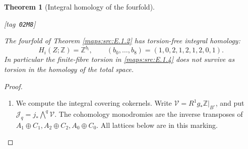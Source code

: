 \documentclass[11pt,a4paper]{article}
\makeatletter
\numberwithin{equation}{section}
\newtheorem{theorem}{Theorem}[section]
\theoremstyle{definition}
\newcommand{\StatementRecord}[4]{{\upshape\footnotesize[tag~\texttt{#3}]}\enspace\ignorespaces}
\newcommand{\SeriesRefText}[1]{\ifcsname SRef@#1\endcsname\csname SRef@#1\endcsname\else\textbf{UNRESOLVED}\fi}
\newcommand{\SeriesRef}[1]{\ifmmode\text{\SeriesRefText{#1}}\else\SeriesRefText{#1}\fi}
\makeatother
\begin{document}
\begin{theorem}[Integral homology of the fourfold]\hypertarget{tag-02M8}{}\label{maps:src:E.1.5}
\StatementRecord{maps:src:E.1.5}{proved}{02M8}{\cref{maps:src:E.1.2}, \cref{maps:src:E.1.4}, \eqref{maps:eq:E.I1}, \cref{maps:src:E.1.3}, \SeriesRef{maps:src:D.1.4}, \eqref{maps:eq:E.I2}, \eqref{maps:eq:E.I3}, \eqref{maps:eq:E.I5}, \eqref{maps:eq:E.I4}}


The fourfold of Theorem \ref{maps:src:E.1.2} has torsion-free integral homology:
\[
 H_i(Z;\mathbb Z)=\mathbb Z^{b_i},\qquad
 (b_0,\ldots,b_8)=(1,0,2,1,2,1,2,0,1).
\]
In particular the finite-fibre torsion in \ref{maps:src:E.1.4} does not survive
as torsion in the homology of the total space.

\end{theorem}


\begin{proof}
\begin{enumerate}[label=\arabic*.,leftmargin=*]
\item We compute the integral covering cokernels. Write
\(\mathcal V=R^1g_*\mathbb Z|_{B^\circ}\), and put
\(\mathcal J_q=j_*\bigwedge^q\mathcal V\).
The cohomology monodromies are the inverse transposes of
\(A_1\oplus C_1,A_2\oplus C_2,A_0\oplus C_0\).
All lattices below are in this marking.


\end{enumerate}
\end{proof}
\end{document}
